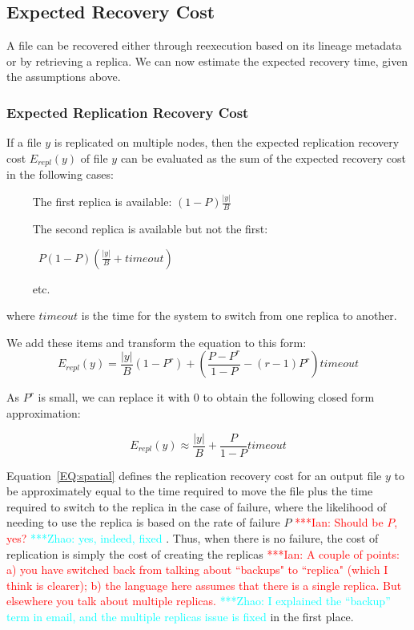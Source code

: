 \documentclass{sig-alternate}
\newcommand{\iannote}[1]{ {\textcolor{red}    { ***Ian:      #1 }}}
\newcommand{\zhaonote}[1]{{\textcolor{cyan}    { ***Zhao:      #1 }}}
\newcommand{\iannote}[1]{}
\newcommand{\zhaonote}[1]{}
\begin{document}
\subsection{Expected Recovery Cost}
A file can be recovered either through reexecution based on its lineage metadata or by retrieving a replica.
We can now estimate the expected recovery time, given the assumptions above.

\subsubsection{Expected Replication Recovery Cost}
If a file $y$ is replicated on multiple nodes,
then the expected replication recovery cost $E_{repl}(y)$ of file $y$ can be evaluated as the sum
of the expected recovery cost in the following cases:

\noindent ~~~~ The first replica is available: $(1-P)\frac{|y|}{B}$

\noindent ~~~~ The second replica is available but not the first:\\

\vspace{-2ex}

~~~~~ $P(1-P)\left(\frac{|y|}{B}+timeout\right)$

\noindent ~~~~ etc.

\noindent where $timeout$ is the time for the system to switch from one replica to another.

We add these items and transform the equation to this form:
\begin{equation}
E_{repl}(y) = \frac{|y|}{B}\left(1-P^r\right) + \left(\frac{P-P^r}{1-P}-(r-1)P^r\right)timeout
\end{equation}

As $P^r$ is small, we can replace it with $0$ to obtain the following closed form approximation:

\begin{equation}
E_{repl}(y) \approx \frac{|y|}{B}+\frac{P}{1-P}timeout
\label{EQ:spatial}
\end{equation}

Equation~\ref{EQ:spatial} defines the replication recovery cost for an output file $y$ to be approximately 
equal to the time required to move the file plus the time required to switch to the replica
in the case of failure, where the likelihood of needing to use the replica is based on the rate of failure $P$
\iannote{Should be $P$, yes?}\zhaonote{yes, indeed, fixed}. 
Thus, when there is no failure, the cost of replication is simply the cost of creating the replicas\iannote{A couple of points: a) you have switched back from talking about ``backups" to ``replica" (which I think is clearer); b) the language here assumes that there is a single replica. But elsewhere you talk about multiple replicas.} \zhaonote{I explained the ``backup'' term in email, and the multiple replicas issue is fixed} in the first place. 
\end{document}
